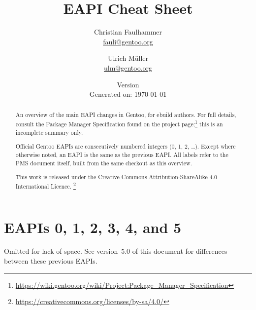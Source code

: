 \documentclass[a4paper,nofoldmark]{leaflet}
\title{EAPI Cheat Sheet}
\author{%
    Christian Faulhammer \\
    \href{mailto:fauli@gentoo.org}{fauli@gentoo.org}
    \and
    Ulrich Müller \\
    \href{mailto:ulm@gentoo.org}{ulm@gentoo.org}
}
\date{%
    Version \version \\
    \ifthenelse{\equal{\gitCommitterDate}{(None)}}
    {Generated on: \today}
    {\printdate{\gitCommitterDate}}%
}
\newcommand{\code}[1]{\texttt{#1}}
\newcommand{\featureref}[1]{\textsc{#1} on page~\pageref{feat:#1}}
\begin{document}
\maketitle
\thispagestyle{empty}
\begin{abstract}
    An overview of the main EAPI changes in Gentoo, for ebuild
    authors.  For full details, consult the Package Manager
    Specification found on the project page;\footnote{%
    \url{https://wiki.gentoo.org/wiki/Project:Package_Manager_Specification}}
    this is an incomplete summary only.

    Official Gentoo EAPIs are consecutively numbered integers (0, 1,
    2, \dots).  Except where otherwise noted, an EAPI is the same as
    the previous EAPI\@.  All labels refer to the PMS document itself,
    built from the same checkout as this overview.


    This work is released under the Creative Commons
    Attribution-ShareAlike 4.0 International Licence.%
    \footnote{\url{https://creativecommons.org/licenses/by-sa/4.0/}}
\end{abstract}

\section{EAPIs 0, 1, 2, 3, 4, and 5}
\label{sec:cs:eapi0-2}
Omitted for lack of space. See version~5.0 of this document for
differences between these previous EAPIs.


\end{document}
